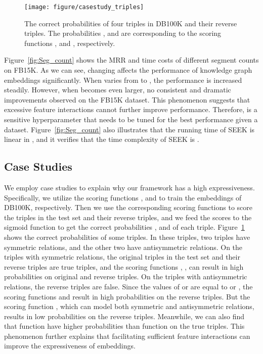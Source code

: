 \documentclass[11pt,a4paper]{article}
\begin{document}
\begin{figure}[!h]
	\centering
	\texttt{[image: figure/casestudy\_triples]}
	\caption{The correct probabilities of four triples in DB100K and their reverse triples. The probabilities ,  and  are corresponding to the scoring functions ,  and , respectively.}
	\label{fig:case_study}
\end{figure}
Figure~\ref{fig:Seg_count} shows the MRR and time costs of different segment counts  on FB15K. As we can see, changing  affects the performance of knowledge graph embeddings significantly. When  varies from  to , the performance is increased steadily. However, when  becomes even larger, no consistent and dramatic improvements observed on the FB15K dataset. This phenomenon suggests that excessive feature interactions cannot further improve performance. Therefore,  is a sensitive hyperparameter that needs to be tuned for the best performance given a dataset. Figure~\ref{fig:Seg_count} also illustrates that the running time of SEEK is linear in , and it verifies that the time complexity of SEEK is .


\subsection{Case Studies}
We employ case studies to explain why our framework has a high expressiveness.
Specifically, we utilize the scoring functions ,  and  to train the embeddings of DB100K, respectively. Then we use the corresponding scoring functions to score the triples in the test set and their reverse triples, and we feed the scores to the sigmoid function to get the correct probabilities ,  and  of each triple.
Figure~\ref{fig:case_study} shows the correct probabilities of some triples. In these triples, two triples have symmetric relations, and the other two have antisymmetric relations. On the triples with symmetric relations, the original triples in the test set and their reverse triples are true triples, and the scoring functions , ,  can result in high probabilities on original and reverse triples. On the triples with antisymmetric relations, the reverse triples are false. Since the values of  or  are equal to  or , the scoring functions  and  result in high probabilities on the reverse triples. But the scoring function , which can model both symmetric and antisymmetric relations, results in low probabilities on the reverse triples. Meanwhile, we can also find that function  have higher probabilities than function  on the true triples. This phenomenon further explains that facilitating sufficient feature interactions can improve the expressiveness of embeddings.
\end{document}
